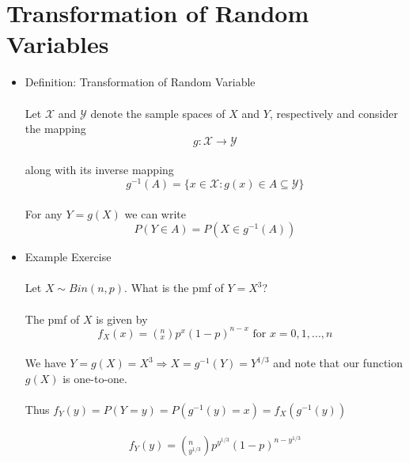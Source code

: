 \documentclass{article}
\begin{document}
\section{Transformation of Random Variables}
\begin{itemize}
    \item Definition: Transformation of Random Variable\\\\
    Let $\mathcal{X}$ and $\mathcal{Y}$ denote the sample spaces of $X$ and $Y$, respectively and consider the mapping\\
    $$g:\mathcal{X}\rightarrow\mathcal{Y}$$\\
    along with its inverse mapping \\
    $$g^{-1}(A)=\{x\in\mathcal{X}:g(x)\in A\subseteq\mathcal{Y}\}$$\\
    For any $Y=g(X)$ we can write\\
    $$P(Y\in A)=P(X\in g^{-1}(A))$$
    \item Example Exercise\\\\
    Let $X\sim Bin(n,p)$.  What is the pmf of $Y=X^3$?\\\\
    The pmf of $X$ is given by\\
    $$f_X(x)=(^{n}_{x})p^x(1-p)^{n-x}\text{ for }x=0,1,...,n$$\\
    We have $Y=g(X)=X^3\Rightarrow X=g^{-1}(Y)=Y^{1/3}$ and note that our function $g(X)$ is one-to-one.\\\\ 
    Thus $f_Y(y)=P(Y=y)=P(g^{-1}(y)=x)=f_X(g^{-1}(y))$\\\\
    $$f_Y(y)=(^{n}_{y^{1/3}})p^{y^{1/3}}(1-p)^{n-y^{1/3}}$$
\end{itemize}
\pagebreak
\end{document}
